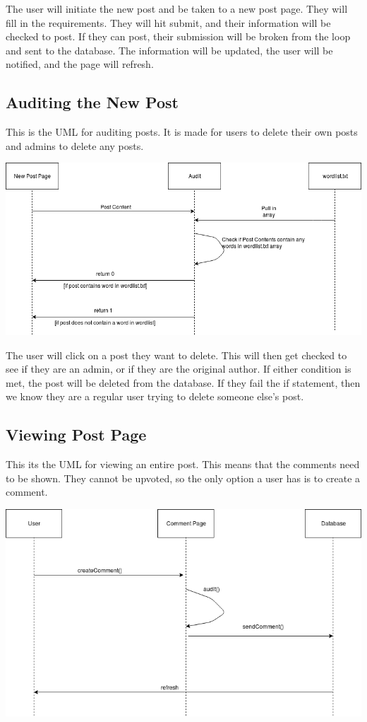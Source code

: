 \documentclass[12pt]{article}
\begin{document}
The user will initiate the new post and be taken to a new post page. They will fill in the requirements. They will hit submit, and their information will be checked to post. If they can post, their submission will be broken from the loop and sent to the database. The information will be updated, the user will be notified, and the page will refresh.
\subsection{Auditing the New Post}
This is the UML for auditing posts. It is made for users to delete their own posts and admins to delete any posts.

\includegraphics[scale=0.85]{img/uml/audit}

The user will click on a post they want to delete. This will then get checked to see if they are an admin, or if they are the original author. If either condition is met, the post will be deleted from the database. If they fail the if statement, then we know they are a regular user trying to delete someone else’s post.
\subsection{Viewing Post Page}
This its the UML for viewing an entire post. This means that the comments need to be shown. They cannot be upvoted, so the only option a user has is to create a comment.

\includegraphics[scale=0.85]{img/uml/createComment}
\end{document}
